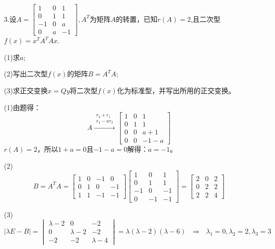 \documentclass{article}
\begin{document}
3.设$
A=
\begin{bmatrix}
  1 & 0 & 1 \\
  0 & 1 & 1 \\
  -1 & 0 & a \\
  0 & a & -1
\end{bmatrix},A^{T}
$为矩阵$A$的转置，已知$r(A)=2$,且二次型$f(x)=x^{T}A^{T}Ax$.

(1)求$a$;

(2)写出二次型$f(x)$的矩阵$B=A^{T}A$;

(3)求正交变换$x=Qy$将二次型$f(x)$化为标准型，并写出所用的正交变换。

\begin{jie}
(1)由题得：
\begin{equation*}
A
\xrightarrow{\substack{r_{3}+r_{1} \\r_4-ar_2}}
{
\begin{bmatrix}
  1 & 0 & 1 \\
  0 & 1 & 1 \\
  0 & 0 & a+1 \\
  0 & 0 & -1-a
\end{bmatrix}
}
\end{equation*}
$r(A)=2$，所以$1+a=0$且$-1-a=0$解得：$a=-1$。

(2)
\begin{equation*}
B=A^TA=
\begin{bmatrix}
1 & 0 &-1 & 0\\
0 & 1 & 0 &-1\\
1 & 1 & -1 &-1
\end{bmatrix}
\begin{bmatrix}
  1 & 0 & 1 \\
  0 & 1 & 1 \\
  -1 & 0 & -1 \\
  0 & -1 & -1
\end{bmatrix}=\begin{bmatrix}
                2 & 0&2 \\
                0 & 2&2\\
                2& 2&4
              \end{bmatrix}
\end{equation*}

(3)
\begin{equation*}
|\lambda E-B|=
\begin{vmatrix}
\lambda-2 & 0 &-2\\
0&\lambda-2& -2\\
-2&-2&\lambda-4
\end{vmatrix}=\lambda(\lambda-2)(\lambda-6)~~~\Rightarrow~~~\lambda_1=0,\lambda_2=2,\lambda_3=3
\end{equation*}


\end{jie}
\end{document}
